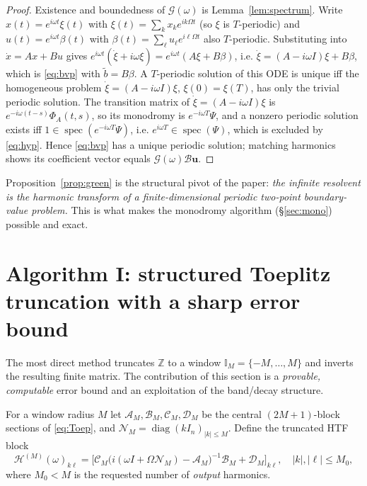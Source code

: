 \documentclass{amsart}
\theoremstyle{definition}
\DeclareMathOperator{\spec}{spec}
\DeclareMathOperator{\diag}{diag}
\newcommand{\Z}{\mathbb{Z}}
\newcommand{\Acal}{\mathcal{A}}
\newcommand{\Bcal}{\mathcal{B}}
\newcommand{\Ccal}{\mathcal{C}}
\newcommand{\Dcal}{\mathcal{D}}
\newcommand{\Hcal}{\mathcal{H}}
\newcommand{\Ncal}{\mathcal{N}}
\begin{document}
\begin{proof}
Existence and boundedness of $\mathcal G(\omega)$ is Lemma~\ref{lem:spectrum}.
Write $x(t)=e^{i\omega t}\xi(t)$ with $\xi(t)=\sum_k x_k e^{ik\Omega t}$ (so
$\xi$ is $T$-periodic) and $u(t)=e^{i\omega t}\beta(t)$ with
$\beta(t)=\sum_\ell u_\ell e^{i\ell\Omega t}$ also $T$-periodic. Substituting
into $\dot x=A x+Bu$ gives
$e^{i\omega t}(\dot\xi+i\omega\xi)=e^{i\omega t}(A\xi+B\beta)$, i.e.
$\dot\xi=(A-i\omega I)\xi+B\beta$, which is \eqref{eq:bvp} with
$\tilde b=B\beta$. A $T$-periodic solution of this ODE is unique iff the
homogeneous problem $\dot\xi=(A-i\omega I)\xi$, $\xi(0)=\xi(T)$, has only the
trivial periodic solution. The transition matrix of $\dot\xi=(A-i\omega I)\xi$
is $e^{-i\omega(t-s)}\Phi_A(t,s)$, so its monodromy is $e^{-i\omega T}\Psi$, and
a nonzero periodic solution exists iff $1\in\spec(e^{-i\omega T}\Psi)$, i.e.
$e^{i\omega T}\in\spec(\Psi)$, which is excluded by \eqref{eq:hyp}. Hence
\eqref{eq:bvp} has a unique periodic solution; matching harmonics shows its
coefficient vector equals $\mathcal G(\omega)\Bcal\mathbf u$.
\end{proof}

Proposition~\ref{prop:green} is the structural pivot of the paper: \emph{the
infinite resolvent is the harmonic transform of a finite-dimensional periodic
two-point boundary-value problem.} This is what makes the monodromy algorithm
(\S\ref{sec:mono}) possible and exact.

\section{Algorithm I: structured Toeplitz truncation with a sharp error bound}
\label{sec:trunc}

The most direct method truncates $\Z$ to a window
$\mathbb{I}_M=\{-M,\dots,M\}$ and inverts the resulting finite matrix. The
contribution of this section is a \emph{provable, computable} error bound and an
exploitation of the band/decay structure.

For a window radius $M$ let $\Acal_M,\Bcal_M,\Ccal_M,\Dcal_M$ be the central
$(2M{+}1)$-block sections of \eqref{eq:Toep}, and
$\Ncal_M=\diag(kI_n)_{|k|\le M}$. Define the truncated HTF block
\begin{equation}\label{eq:HTFtrunc}
\Hcal^{(M)}(\omega)_{k\ell}
=\big[\Ccal_M\big(i(\omega I+\Omega\Ncal_M)-\Acal_M\big)^{-1}\Bcal_M+\Dcal_M\big]_{k\ell},
\quad |k|,|\ell|\le M_0,
\end{equation}
where $M_0<M$ is the requested number of \emph{output} harmonics.
\end{document}
